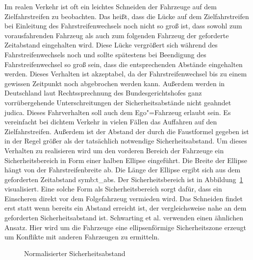 Im realen Verkehr ist oft ein leichtes Schneiden der Fahrzeuge auf dem Zielfahrstreifen zu beobachten.
Das hei{\ss}t, dass die L\"ucke auf dem Zielfahrstreifen bei Einleitung des Fahrstreifenwechsels noch nicht so gro{\ss} ist, dass sowohl zum vorausfahrenden Fahrzeug als auch zum folgenden Fahrzeug der geforderte Zeitabstand eingehalten wird.
Diese L\"ucke vergr\"o{\ss}ert sich w\"ahrend des Fahrstreifenwechsels noch und sollte sp\"atestens bei Beendigung des Fahrstreifenwechsel so gro{\ss} sein, dass die entsprechenden Abst\"ande eingehalten werden.
Dieses Verhalten ist akzeptabel, da der Fahrstreifenwechsel bis zu einem gewissen Zeitpunkt noch abgebrochen werden kann.
Au{\ss}erdem werden in Deutschland laut Rechtssprechnung des Bundesgerichtshofes ganz vorr\"ubergehende Unterschreitungen der Sicherheitsabst\"ande nicht geahndet \gls{judica}.
Dieses Fahrverhalten soll auch dem Ego"=Fahrzeug erlaubt sein.
Es vereinfacht bei dichtem Verkehr in vielen F\"allen das Auffahren auf den Zielfahrstreifen.
Au{\ss}erdem ist der Abstand der durch die Faustformel gegeben ist in der Regel gr\"o{\ss}er als der tats\"achlich notwendige Sicherheitsabstand.
Um dieses Verhalten zu realisieren wird um den vorderen Bereich der Fahrzeuge ein Sicherheitsbereich in Form einer halben Ellipse eingef\"uhrt.
Die Breite der Ellipse h\"angt von der Fahrstreifenbreite ab.
Die L\"ange der Ellipse ergibt sich aus dem geforderten Zeitabstand \gls{symb:t_abs}.
Der Sicherheitsbereich ist in Abbildung~\ref{fig:NormSD} visualisiert.
Eine solche Form als Sicherheitsbereich sorgt daf\"ur, dass ein Einscheren direkt vor dem Folgefahrzeug vermieden wird. 
Das Schneiden findet erst statt wenn bereits ein Abstand erreicht ist, der vergleichsweise nahe an dem geforderten Sicherheitsabstand ist.
Schwarting et al. \cite{Schwarting2014} verwenden einen \"ahnlichen Ansatz.
Hier wird um die Fahrzeuge eine ellipsenf\"ormige Sicherheitszone erzeugt um Konflikte mit anderen Fahrzeugen zu ermitteln.

\begin{figure}[!htbp]
    \centering
    \caption[Normalisierter Sicherheitsabstand]{Normalisierter Sicherheitsabstand}
    \label{fig:NormSD}
\end{figure}



